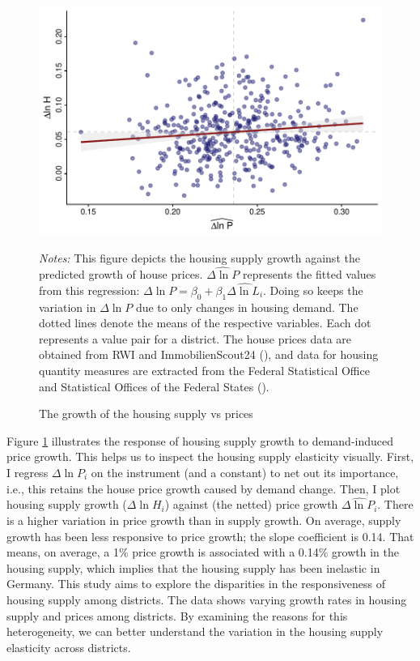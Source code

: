 \documentclass[
  12pt,
]{article}
\begin{document}
\begin{figure}[H]
\centering

\begin{center}\includegraphics{output/figs/quantity-vs-price-netted-out-1} \end{center}

\caption{The growth of the housing supply vs prices}\label{fig:quantity-vs-price-netted-out}
\medskip
\begin{minipage}{0.9\textwidth}
\footnotesize
\textit{Notes:} This figure depicts the housing supply growth against the predicted growth of house prices. $\widehat{\Delta\ln P}$ represents the fitted values from this regression: $\Delta\ln P = \beta_0 + \beta_1\widehat{\Delta\ln L_i}$. Doing so keeps the variation in $\Delta\ln P$ due to only changes in housing demand. The dotted lines denote the means of the respective variables. Each dot represents a value pair for a district. The house prices data are obtained from RWI and ImmobilienScout24 (), and data for housing quantity measures are extracted from the Federal Statistical Office and Statistical Offices of the Federal States ().
\end{minipage}
\end{figure}

Figure \ref{fig:quantity-vs-price-netted-out} illustrates the response of housing supply growth to demand-induced price growth. This helps us to inspect the housing supply elasticity visually. First, I regress \(\Delta \ln P_i\) on the instrument (and a constant) to net out its importance, i.e., this retains the house price growth caused by demand change. Then, I plot housing supply growth (\(\Delta\ln H_i\)) against (the netted) price growth \(\widehat{\Delta\ln P_i}\). There is a higher variation in price growth than in supply growth. On average, supply growth has been less responsive to price growth; the slope coefficient is 0.14. That means, on average, a 1\% price growth is associated with a 0.14\% growth in the housing supply, which implies that the housing supply has been inelastic in Germany. This study aims to explore the disparities in the responsiveness of housing supply among districts. The data shows varying growth rates in housing supply and prices among districts. By examining the reasons for this heterogeneity, we can better understand the variation in the housing supply elasticity across districts.
\end{document}

